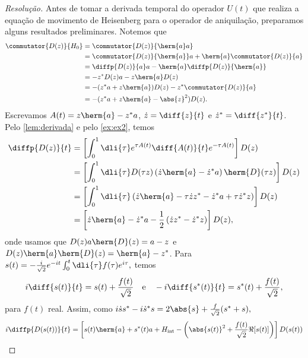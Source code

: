 \begin{proof}[Resolução]
   Antes de tomar a derivada temporal do operador \(U(t)\) que realiza a equação de movimento de Heisenberg para o operador de aniquilação, preparamos alguns resultados preliminares. Notemos que
   \begin{align*}
      \commutator{D(z)}{H_0} &= \commutator{D(z)}{\herm{a}a}\\
                             &= \commutator{D(z)}{\herm{a}}a + \herm{a}\commutator{D(z)}{a}\\
                             &= \diffp{D(z)}{a}a - \herm{a} \diffp{D(z)}{\herm{a}}\\
                             &= -z^*D(z) a - z\herm{a} D(z)\\
                             &= -(z^* a + z \herm{a}) D(z) - z^* \commutator{D(z)}{a}\\
                             &= -(z^*a + z \herm{a} - \abs{z}^2) D(z).
   \end{align*}
   Escrevamos \(A(t) = z \herm{a} - z^* a\), \(\dot{z} = \diff{z}{t}\) e \(\dot{z}^* = \diff{z^*}{t}\). Pelo \cref{lem:derivada} e pelo \cref{ex:ex2}, temos
   \begin{align*}
      \diffp{D(z)}{t}%
      &= \left[\int_0^1 \dli{\tau} e^{\tau A(t)} \diff{A(t)}{t} e^{-\tau A(t)}\right]D(z)\\
      &= \left[\int_0^1 \dli{\tau} D(\tau z) \left(\dot{z}\herm{a} - \dot{z}^*a\right) \herm{D}(\tau z)\right]D(z)\\
      &= \left[\int_0^1 \dli{\tau} \left(\dot{z} \herm{a} - \tau \dot{z}z^* - \dot{z}^* a + \tau \dot{z}^* z\right)\right]D(z)\\
      &= \left[\dot{z} \herm{a} - \dot{z}^* a - \frac12 \left(\dot{z} z^* - \dot{z}^* z\right)\right]D(z),
   \end{align*}
   onde usamos que \(D(z) a \herm{D}(z) = a - z\) e \(D(z) \herm{a} \herm{D}(z) = \herm{a} - z^*\). Para \(s(t) = - \frac{i}{\sqrt{2}} e^{-it} \int_0^t \dli{\tau} f(\tau) e^{i \tau},\) temos
   \begin{equation*}
      i\diff{s(t)}{t} = s(t) + \frac{f(t)}{\sqrt{2}}\quad\text{e}\quad -i \diff{s^*(t)}{t} = s^*(t) + \frac{f(t)}{\sqrt{2}},
   \end{equation*}
   para \(f(t)\) real. Assim, como \(i \dot{s} s^* - i\dot{s}^* s = 2\abs{s} + \frac{f}{\sqrt{2}} (s^* + s),\) 
   \begin{equation*}
      i\diffp{D(s(t))}{t} = \left[s(t) \herm{a} + s^*(t)a + H_\mathrm{int} - \left(\abs{s(t)}^2 + \frac{f(t)}{\sqrt{2}} \Re[s(t)]\right)\right]D(s(t))

\end{equation*}
\end{proof}
